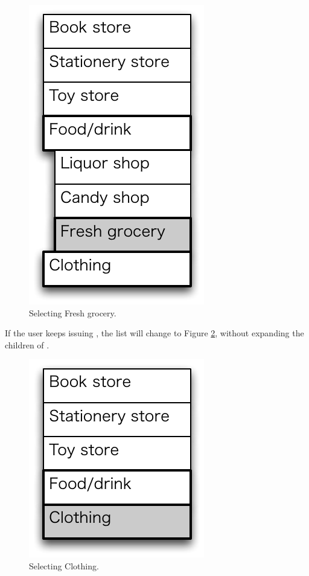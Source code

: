 \documentclass[conference]{IEEEtran}
\def\down{\tsf{▼}}
\begin{document}
\begin{figure}[H]
\centerline{\includegraphics[width=\menuwidth,bb=0 0 139 238]{figures/fig6.pdf}}
\caption{Selecting Fresh grocery.}
\label{fig6}
\end{figure}

If the user keeps issuing {\down}, 
the list will change to Figure \ref{fig8},
without expanding the children of .

\begin{figure}[H]
\centerline{\includegraphics[width=\menuwidth,bb=0 0 139 157]{figures/fig8.pdf}}
\caption{Selecting Clothing.}
\label{fig8}
\end{figure}
\end{document}
